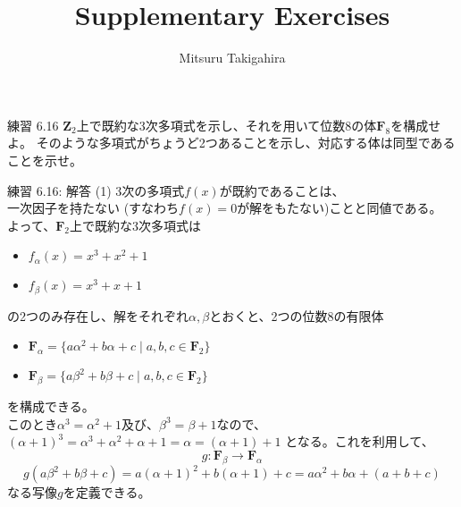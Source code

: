 \documentclass[dvipdfmx,10pt,jsarticle]{beamer}
\title{Supplementary Exercises}
\author{Mitsuru Takigahira}
\date[2017/10/20]{}
\begin{document}
  \frame{\maketitle}
 
  \begin{frame}{練習 6.16}
    $\mathbf{Z}_2$上で既約な3次多項式を示し、それを用いて位数8の体$\mathbf{F}_8$を構成せよ。
    そのような多項式がちょうど2つあることを示し、対応する体は同型であることを示せ。
  \end{frame}

  \begin{frame}{練習 6.16: 解答 (1)}
    3次の多項式$f(x)$が既約であることは、 \\一次因子を持たない (すなわち$f(x) = 0$が解をもたない)ことと同値である。 \\
    よって、$\mathbf{F}_2$上で既約な3次多項式は
    \begin{itemize}
      \item $f_\alpha (x) = x^3 + x^2 + 1$
      \item $f_\beta (x) = x^3 + x + 1$
    \end{itemize}
    の2つのみ存在し、解をそれぞれ$\alpha, \beta$とおくと、2つの位数8の有限体
    \begin{itemize}
      \item $\mathbf{F}_\alpha = \lbrace a \alpha^2 + b \alpha + c \mid a, b, c \in \mathbf{F}_2 \rbrace$
      \item $\mathbf{F}_\beta = \lbrace a \beta^2 + b \beta + c \mid a, b, c \in \mathbf{F}_2 \rbrace$
    \end{itemize}
    を構成できる。\\
    このとき$\alpha^3 = \alpha^2 + 1$及び、$\beta^3 = \beta + 1$なので、\\
    ${(\alpha + 1)}^3 = \alpha^3 + \alpha^2 + \alpha + 1 = \alpha = (\alpha + 1) + 1$ となる。これを利用して、
    \[ g: \mathbf{F}_\beta \rightarrow \mathbf{F}_\alpha \]
    \[g(a \beta^2 + b \beta + c) = a {(\alpha + 1)}^2 + b (\alpha + 1) + c = a \alpha^2 + b \alpha + (a + b + c) \]
    なる写像$g$を定義できる。 \\
  \end{frame}
\end{document}
